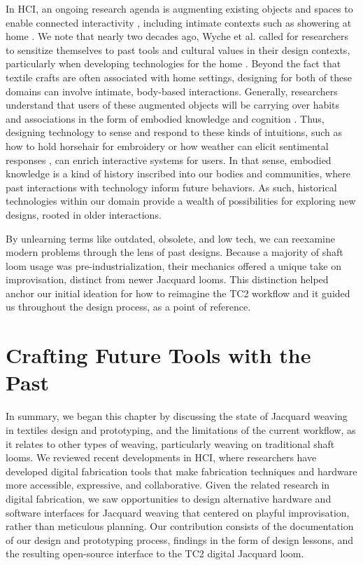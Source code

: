 In HCI, an ongoing research agenda is augmenting existing objects and spaces to enable connected interactivity \cite{marques_pervasive_2019, zeagler_where_2017}, including intimate contexts such as showering at home \cite{kwon_connected_2018}. We note that nearly two decades ago, Wyche et al. called for researchers to sensitize themselves to past tools and cultural values in their design contexts, particularly when developing technologies for the home \cite{wyche_historical_2006}. Beyond the fact that textile crafts are often associated with home settings, designing for both of these domains can involve intimate, body-based interactions. Generally, researchers understand that users of these augmented objects will be carrying over habits and associations in the form of embodied knowledge and cognition \cite{lingel_poetics_2016}. Thus, designing technology to sense and respond to these kinds of intuitions, such as how to hold horsehair for embroidery \cite{flanagan_tracing_2019} or how weather can elicit sentimental responses \cite{brueckner_embodisuit_2018}, can enrich interactive systems for users. In that sense, embodied knowledge is a kind of history inscribed into our bodies and communities, where past interactions with technology inform future behaviors. As such, historical technologies within our domain provide a wealth of possibilities for exploring new designs, rooted in older interactions.

By unlearning terms like outdated, obsolete, and low tech, we can reexamine modern problems through the lens of past designs. Because a majority of shaft loom usage was pre-industrialization, their mechanics offered a unique take on improvisation, distinct from newer Jacquard looms. This distinction helped anchor our initial ideation for how to reimagine the TC2 workflow and it guided us throughout the design process, as a point of reference. 


\section{Crafting Future Tools with the Past}
\label{sect-conclusion}

In summary, we began this chapter by discussing the state of Jacquard weaving in textiles design and prototyping, and the limitations of the current workflow, as it relates to other types of weaving, particularly weaving on traditional shaft looms. We reviewed recent developments in HCI, where researchers have developed digital fabrication tools that make fabrication techniques and hardware more accessible, expressive, and collaborative. Given the related research in digital fabrication, we saw opportunities to design alternative hardware and software interfaces for Jacquard weaving that centered on playful improvisation, rather than meticulous planning. Our contribution consists of the documentation of our design and prototyping process, findings in the form of design lessons, and the resulting open-source interface to the TC2 digital Jacquard loom.

